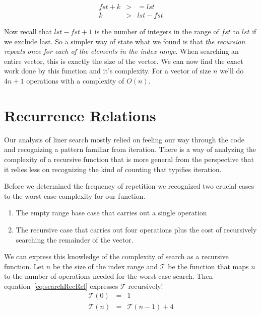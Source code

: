 \documentclass[nobib]{tufte-handout}
\begin{document}
\begin{equation}
  \begin{array}{rcl}
  fst + k &>&= lst \\
  k &>& lst - fst
  \end{array}
\end{equation}

Now recall that $lst-fst+1$ is the number of integers in the range of $fst$ to $lst$ if we exclude last. So a simpler way of state what we found is that \textit{the recursion repeats once for each of the elements in the index range}.  When searching an entire vector, this is exactly the size of the vector. We can now find the exact work done by this function and it's complexity. For a vector of size $n$ we'll do $4n+1$ operations with a complexity of $O(n)$.

\section{Recurrence Relations}

Our analysis of liner search mostly relied on feeling our way through the code and recognizing a pattern familiar from iteration. There is a way of analyzing the complexity of a recursive function that is more general from the perspective that it relies less on recognizing the kind of counting that typifies iteration.

Before we determined the frequency of repetition we recognized two crucial cases to the worst case complexity for our function.
\begin{enumerate}
  \item The empty range base case that carries out a single operation
  \item The recursive case that carries out four operations plus the cost of recursively searching the remainder of the vector.
\end{enumerate}

We can express this knowledge of the complexity of search as a recursive function. Let $n$ be the size of the index range and $\mathcal{T}$ be the function that maps $n$ to the number of operations needed for the worst case search. Then equation~\ref{eq:searchRecRel} expresses $\mathcal{T}$ recursively!
\begin{equation}
  \begin{array}{rcl}
    \mathcal{T}(0) &=& 1 \\
    \mathcal{T}(n) &=& \mathcal{T}(n-1) + 4
  \end{array}
\label{eq:searchRecRel}
\end{equation}
\end{document}

